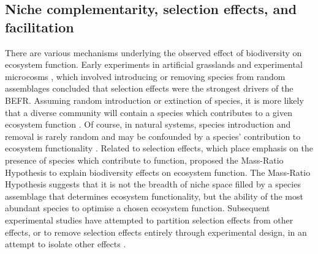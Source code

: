 \begin{refsection}
\subsection{Niche complementarity, selection effects, and facilitation}

There are various mechanisms underlying the observed effect of biodiversity on ecosystem function. Early experiments in artificial grasslands \citep{Tilman1994} and experimental microcosms \citep{Naeem1994}, which involved introducing or removing species from random assemblages concluded that selection effects were the strongest drivers of the BEFR. Assuming random introduction or extinction of species, it is more likely that a diverse community will contain a species which contributes to a given ecosystem function \citep{Huston1997}. Of course, in natural systems, species introduction and removal is rarely random and may be confounded by a species' contribution to ecosystem functionality \citep{Smith2003}. Related to selection effects, which place emphasis on the presence of species which contribute to function, \citet{Grime1998} proposed the Mass-Ratio Hypothesis to explain biodiversity effects on ecosystem function. The Mass-Ratio Hypothesis suggests that it is not the breadth of niche space filled by a species assemblage that determines ecosystem functionality, but the ability of the most abundant species to optimise a chosen ecosystem function. Subsequent experimental studies have attempted to partition selection effects from other effects, or to remove selection effects entirely through experimental design, in an attempt to isolate other effects \citep{Loreau2001a}.


\end{refsection}
